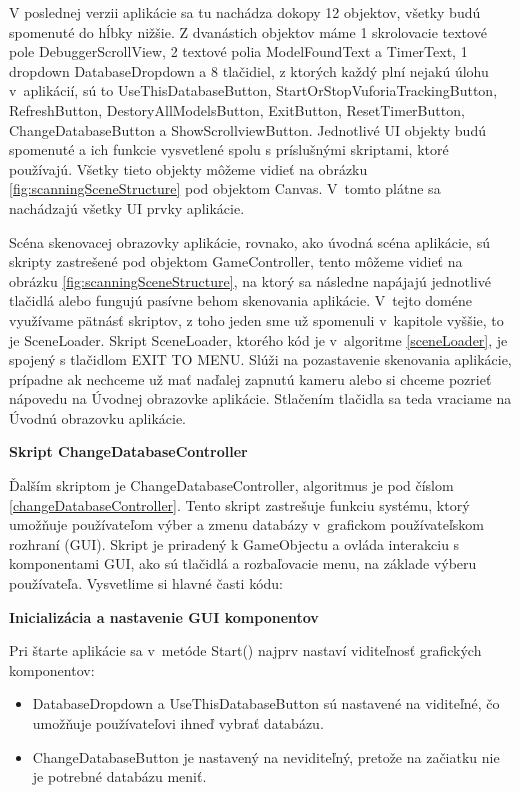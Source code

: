V poslednej verzii aplikácie sa tu nachádza dokopy 12 objektov, všetky budú spomenuté do hĺbky nižšie. Z dvanástich objektov máme 1 skrolovacie textové pole DebuggerScrollView, 2 textové polia ModelFoundText a TimerText, 1 dropdown DatabaseDropdown a 8 tlačidiel, z ktorých každý plní nejakú úlohu v~aplikácií, sú to UseThisDatabaseButton, StartOrStopVuforiaTrackingButton, RefreshButton, DestoryAllModelsButton, ExitButton, ResetTimerButton, ChangeDatabaseButton a ShowScrollviewButton. Jednotlivé UI objekty budú spomenuté a ich funkcie vysvetlené spolu s príslušnými skriptami, ktoré používajú. Všetky tieto objekty môžeme vidieť na obrázku \ref{fig:scanningSceneStructure} pod objektom Canvas. V~tomto plátne sa nachádzajú všetky UI prvky aplikácie.

Scéna skenovacej obrazovky aplikácie, rovnako, ako úvodná scéna aplikácie, sú skripty zastrešené pod objektom GameController, tento môžeme vidieť na obrázku \ref{fig:scanningSceneStructure}, na ktorý sa následne napájajú jednotlivé tlačidlá alebo fungujú pasívne behom skenovania aplikácie. V~tejto doméne využívame pätnásť skriptov, z toho jeden sme už spomenuli v~kapitole vyššie, to je SceneLoader. Skript SceneLoader, ktorého kód je v~algoritme \ref{sceneLoader}, je spojený s tlačidlom EXIT TO MENU. Slúži na pozastavenie skenovania aplikácie, prípadne ak nechceme už mať naďalej zapnutú kameru alebo si chceme pozrieť nápovedu na Úvodnej obrazovke aplikácie. Stlačením tlačidla sa teda vraciame na Úvodnú obrazovku aplikácie. 

{\large\textbf{Skript ChangeDatabaseController}}

Ďalším skriptom je ChangeDatabaseController, algoritmus je pod číslom \ref{changeDatabaseController}. Tento skript zastrešuje funkciu systému, ktorý umožňuje používateľom výber a zmenu databázy v~grafickom používateľskom rozhraní (GUI). Skript je priradený k GameObjectu a ovláda interakciu s komponentami GUI, ako sú tlačidlá a rozbaľovacie menu, na základe výberu používateľa. Vysvetlime si hlavné časti kódu:

{\small\textbf{Inicializácia a nastavenie GUI komponentov}}

Pri štarte aplikácie sa v~metóde Start() najprv nastaví viditeľnosť grafických komponentov:

\begin{itemize}
    \item DatabaseDropdown a UseThisDatabaseButton sú nastavené na viditeľné, čo umožňuje používateľovi ihneď vybrať databázu.
    \item ChangeDatabaseButton je nastavený na neviditeľný, pretože na začiatku nie je potrebné databázu meniť.
\end{itemize}

